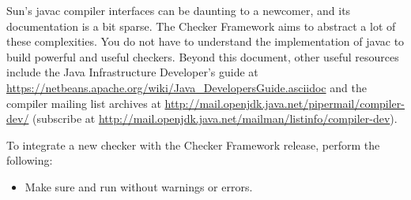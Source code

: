 Sun's javac compiler interfaces can be daunting to a
newcomer, and its documentation is a bit sparse. The Checker Framework
aims to abstract a lot of these complexities.
You do not have to understand the implementation of javac to
build powerful and useful checkers.
Beyond this document,
other useful resources include the Java Infrastructure
Developer's guide at
\url{https://netbeans.apache.org/wiki/Java_DevelopersGuide.asciidoc} and the compiler
mailing list archives at
\url{http://mail.openjdk.java.net/pipermail/compiler-dev/}
(subscribe at
\url{http://mail.openjdk.java.net/mailman/listinfo/compiler-dev}).




To integrate a new checker with the Checker Framework release, perform
the following:

\begin{itemize}

\item Make sure  and  run
without warnings or errors.

\end{itemize}


